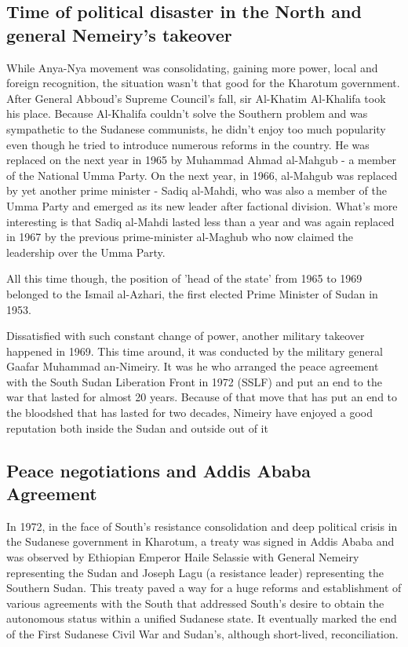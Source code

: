 \documentclass[14pt,a4paper]{article}
\begin{document}
\subsection{Time of political disaster in the North and general Nemeiry's takeover}

While Anya-Nya movement was consolidating, gaining more power, local and foreign recognition, the situation wasn't that good for the Kharotum government. 
After General Abboud's Supreme Council's fall, sir Al-Khatim Al-Khalifa took his place. Because Al-Khalifa couldn't solve the Southern problem and was sympathetic to the Sudanese communists, he didn't enjoy too much popularity even though he tried to introduce numerous reforms in the country.
He was replaced on the next year in 1965 by Muhammad Ahmad al-Mahgub - a member of the National Umma Party. On the next year, in 1966, al-Mahgub was replaced by yet another prime minister - Sadiq al-Mahdi, who was also a member of the Umma Party and emerged as its new leader after factional division. 
What's more interesting is that Sadiq al-Mahdi lasted less than a year and was again replaced in 1967 by the previous prime-minister al-Maghub who now claimed the leadership over the Umma Party. 

All this time though, the position of 'head of the state' from 1965 to 1969 belonged to the Ismail al-Azhari, the first elected Prime Minister of Sudan in 1953. 

Dissatisfied with such constant change of power, another military takeover happened in 1969. This time around, it was conducted by the military general Gaafar Muhammad an-Nimeiry. It was he who arranged the peace agreement with the South Sudan Liberation Front in 1972 (SSLF) and put an end to the war that lasted for almost 20 years. Because of that move that has put an end to the bloodshed that has lasted for two decades, Nimeiry have enjoyed a good reputation both inside the Sudan and outside out of it \cite{kasfir1977southern}

\subsection{Peace negotiations and Addis Ababa Agreement}

In 1972, in the face of South's resistance consolidation and deep political crisis in the Sudanese government in Kharotum, a treaty was signed in Addis Ababa and was observed by Ethiopian Emperor Haile Selassie with General Nemeiry representing the Sudan and Joseph Lagu (a resistance leader) representing the Southern Sudan. 
This treaty paved a way for a huge reforms and establishment of various agreements with the South that addressed South's desire to obtain the autonomous status within a unified Sudanese state. It eventually marked the end of the First Sudanese Civil War and Sudan's, although short-lived, reconciliation. 
\end{document}
